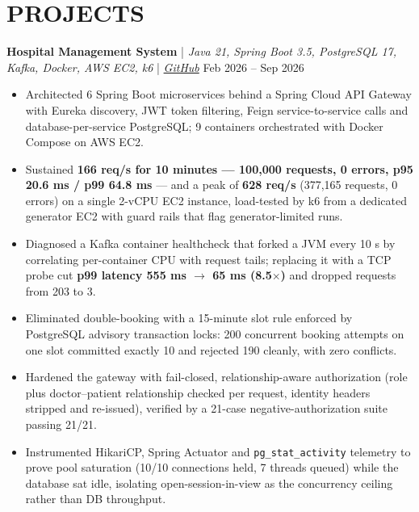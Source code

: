 \documentclass[a4paper,10pt]{article}
\begin{document}
\section*{PROJECTS}

\noindent\textbf{\color{mainblue}Hospital Management System} | \textit{Java 21, Spring Boot 3.5, PostgreSQL 17, Kafka, Docker, AWS EC2, k6} | \href{https://github.com/cyberpunk47/HMS}{\textit{GitHub}} \hfill Feb 2026 -- Sep 2026
\begin{itemize}[leftmargin=1.5em, itemsep=0pt, topsep=1pt, parsep=0pt, partopsep=0pt, label={\textbullet}]
    \item Architected 6 Spring Boot microservices behind a Spring Cloud API Gateway with Eureka discovery, JWT token filtering, Feign service-to-service calls and database-per-service PostgreSQL; 9 containers orchestrated with Docker Compose on AWS EC2.
    \item Sustained \textbf{166 req/s for 10 minutes --- 100,000 requests, 0 errors, p95 20.6 ms / p99 64.8 ms} --- and a peak of \textbf{628 req/s} (377,165 requests, 0 errors) on a single 2-vCPU EC2 instance, load-tested by k6 from a dedicated generator EC2 with guard rails that flag generator-limited runs.
    \item Diagnosed a Kafka container healthcheck that forked a JVM every 10 s by correlating per-container CPU with request tails; replacing it with a TCP probe cut \textbf{p99 latency 555 ms $\rightarrow$ 65 ms (8.5$\times$)} and dropped requests from 203 to 3.
    \item Eliminated double-booking with a 15-minute slot rule enforced by PostgreSQL advisory transaction locks: 200 concurrent booking attempts on one slot committed exactly 10 and rejected 190 cleanly, with zero conflicts.
    \item Hardened the gateway with fail-closed, relationship-aware authorization (role plus doctor--patient relationship checked per request, identity headers stripped and re-issued), verified by a 21-case negative-authorization suite passing 21/21.
    \item Instrumented HikariCP, Spring Actuator and \texttt{pg\_stat\_activity} telemetry to prove pool saturation (10/10 connections held, 7 threads queued) while the database sat idle, isolating open-session-in-view as the concurrency ceiling rather than DB throughput.
\end{itemize}
\end{document}
